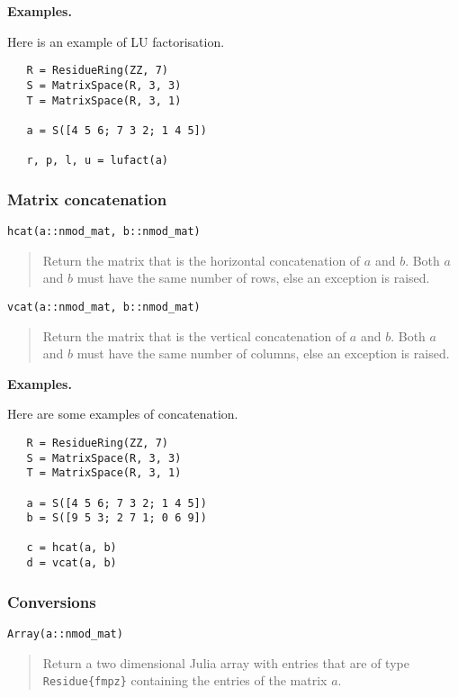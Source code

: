 \documentclass[a4paper,10pt]{article}
\newcommand{\code}{\lstinline}
\newcommand{\desc}[1]{\vspace{-3mm}\begin{quote}#1\end{quote}}
\begin{document}
{{\textbf{Examples.}

Here is an example of LU factorisation.

\begin{lstlisting}
   R = ResidueRing(ZZ, 7)
   S = MatrixSpace(R, 3, 3)
   T = MatrixSpace(R, 3, 1)

   a = S([4 5 6; 7 3 2; 1 4 5])
  
   r, p, l, u = lufact(a)
\end{lstlisting}

\subsubsection{Matrix concatenation}

\begin{lstlisting}
hcat(a::nmod_mat, b::nmod_mat)
\end{lstlisting}

\desc{Return the matrix that is the horizontal concatenation of $a$ and $b$.
Both $a$ and $b$ must have the same number of rows, else an exception is raised.}

\begin{lstlisting}
vcat(a::nmod_mat, b::nmod_mat)
\end{lstlisting}

\desc{Return the matrix that is the vertical concatenation of $a$ and $b$.
Both $a$ and $b$ must have the same number of columns, else an exception is raised.}

\textbf{Examples.}

Here are some examples of concatenation.

\begin{lstlisting}
   R = ResidueRing(ZZ, 7)
   S = MatrixSpace(R, 3, 3)
   T = MatrixSpace(R, 3, 1)

   a = S([4 5 6; 7 3 2; 1 4 5])
   b = S([9 5 3; 2 7 1; 0 6 9])
  
   c = hcat(a, b)
   d = vcat(a, b)
\end{lstlisting}

\subsubsection{Conversions}

\begin{lstlisting}
Array(a::nmod_mat)
\end{lstlisting}

\desc{Return a two dimensional Julia array with entries that are of type
\code|Residue{fmpz}| containing the entries of the matrix $a$.} 

}}
\end{document}
